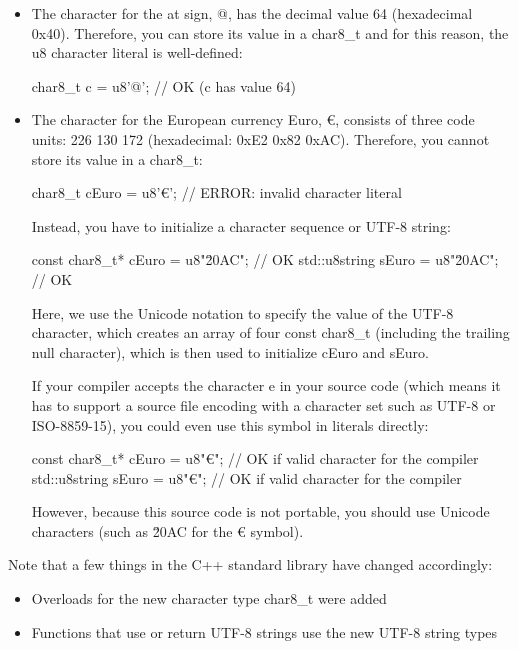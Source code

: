 \begin{itemize}
\item 
The character for the at sign, @, has the decimal value 64 (hexadecimal 0x40). Therefore, you can store its value in a char8\_t and for this reason, the u8 character literal is well-defined:

\begin{cpp}
char8_t c = u8'@'; // OK (c has value 64)
\end{cpp}

\item 
The character for the European currency Euro, €, consists of three code units: 226 130 172 (hexadecimal: 0xE2 0x82 0xAC). Therefore, you cannot store its value in a char8\_t:

\begin{cpp}
char8_t cEuro = u8'€'; // ERROR: invalid character literal
\end{cpp}

Instead, you have to initialize a character sequence or UTF-8 string:

\begin{cpp}
const char8_t* cEuro = u8"\u20AC"; // OK
std::u8string sEuro = u8"\u20AC"; // OK
\end{cpp}

Here, we use the Unicode notation to specify the value of the UTF-8 character, which creates an array of four const char8\_t (including the trailing null character), which is then used to initialize cEuro and sEuro.

If your compiler accepts the character e in your source code (which means it has to support a source file encoding with a character set such as UTF-8 or ISO-8859-15), you could even use this symbol in literals directly:

\begin{cpp}
const char8_t* cEuro = u8"€"; // OK if valid character for the compiler
std::u8string sEuro = u8"€"; // OK if valid character for the compiler
\end{cpp}

However, because this source code is not portable, you should use Unicode characters (such as \u20AC for the € symbol).

\end{itemize}

Note that a few things in the C++ standard library have changed accordingly:

\begin{itemize}
\item 
Overloads for the new character type char8\_t were added

\item 
Functions that use or return UTF-8 strings use the new UTF-8 string types
\end{itemize}

